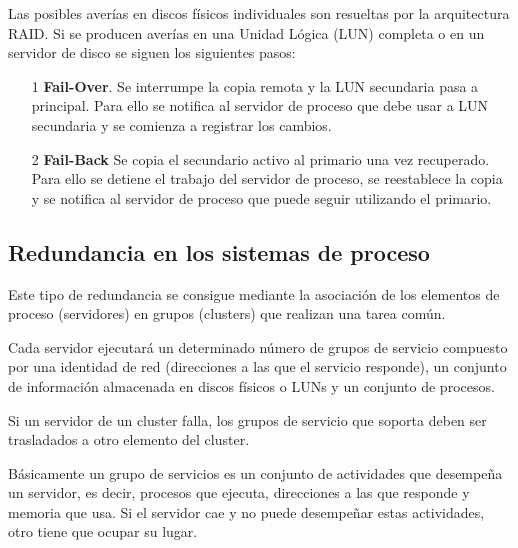 Las posibles averías en discos físicos individuales son resueltas por la arquitectura RAID. Si se producen averías en una Unidad Lógica (LUN) completa o en un servidor de disco se siguen los siguientes pasos:
\begin{enumerate}
\item[1] \textbf{Fail-Over}. Se interrumpe la copia remota y la LUN secundaria pasa a principal. Para ello se notifica al servidor de proceso que debe usar a LUN secundaria y se comienza a registrar los cambios.

\item[2] \textbf{Fail-Back} Se copia el secundario activo al primario una vez recuperado. Para ello se detiene el trabajo del servidor de proceso, se reestablece la copia y se notifica al servidor de proceso que puede seguir utilizando el primario.
\end{enumerate}


\subsection{Redundancia en los sistemas de proceso}
Este tipo de redundancia se consigue mediante la asociación de los elementos de proceso (servidores) en grupos (clusters) que realizan una tarea común.

Cada servidor ejecutará un determinado número de grupos de servicio compuesto por una identidad de red (direcciones a las que el servicio responde), un conjunto de información almacenada en discos físicos o LUNs y un conjunto de procesos.

Si un servidor de un cluster falla, los grupos de servicio que soporta deben ser trasladados a otro elemento del cluster.

Básicamente un grupo de servicios es un conjunto de actividades que desempeña un servidor, es decir, procesos que ejecuta, direcciones a las que responde y memoria que usa. Si el servidor cae y no puede desempeñar estas actividades, otro tiene que ocupar su lugar.

